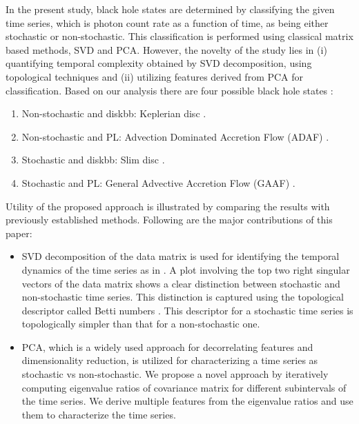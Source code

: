 \documentclass[journal]{IEEEtran}
\begin{document}
In the present study, black hole states are determined by  classifying the given time series, which is photon count rate as a function of time,  as being either stochastic or non-stochastic. This classification is performed using classical matrix based methods, SVD and PCA.
However, the novelty of the study lies in (i) quantifying temporal complexity obtained by SVD decomposition, using topological techniques and (ii) utilizing features derived from PCA for classification. Based on our analysis there are four possible black hole states \cite{Adegoke2018}:
\begin{enumerate}
\item Non-stochastic and diskbb: Keplerian disc \cite{Shakura1973}.
\item Non-stochastic and PL: Advection Dominated Accretion Flow (ADAF)  \cite{narayan1994}.
\item Stochastic and diskbb: Slim disc \cite{Abramowicz1988}.
\item Stochastic and PL: General Advective Accretion Flow (GAAF) \cite{chakrabarti1995, rajesh2010}.
\end{enumerate}

Utility of the proposed approach is illustrated by comparing the results with previously established methods. Following are the major contributions of this paper:
\begin{itemize}
\item SVD decomposition of the data matrix is used for identifying the temporal dynamics of the time series as in \cite{misra2006}. A plot involving the top two right singular vectors of the data matrix shows a clear distinction between stochastic and non-stochastic time series. This distinction is captured using the topological descriptor called Betti numbers \cite{jmlr}. This descriptor for a stochastic time series is topologically simpler than that for a non-stochastic one.

\item PCA, which is a widely used approach for decorrelating features and dimensionality reduction, is utilized for characterizing a time series as stochastic vs non-stochastic. We propose a novel approach by iteratively computing eigenvalue ratios  of covariance matrix for different subintervals of the time series. We  derive multiple features from the eigenvalue ratios and use them to characterize the time series.
\end{itemize}
\end{document}
